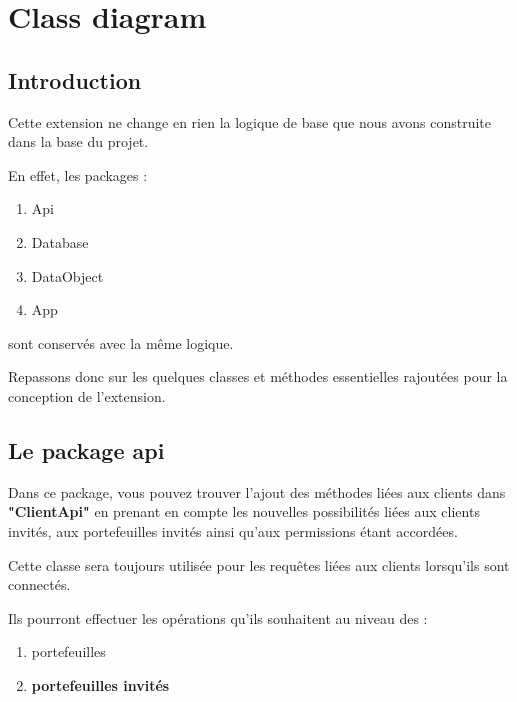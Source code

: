 \section{Class diagram}
\subsection{Introduction}
\begin{flushleft}
Cette extension ne change en rien la logique de base que nous avons construite dans la base du projet.
\end{flushleft}

\begin{flushleft}
En effet, les packages : 
\end{flushleft}
\begin{enumerate}
\item Api
\item Database
\item DataObject
\item App
\end{enumerate}
\begin{flushleft}
sont conservés avec la même logique.
\end{flushleft}

\begin{flushleft}
Repassons donc sur les quelques classes et méthodes essentielles rajoutées pour la conception de l'extension.
\end{flushleft}

\subsection{Le package api}
\begin{flushleft}
Dans ce package, vous pouvez trouver l'ajout des méthodes liées aux clients dans \textbf{"ClientApi"} en prenant en compte les nouvelles possibilités liées aux clients invités, aux portefeuilles invités ainsi qu'aux permissions étant accordées.
\end{flushleft}

\begin{flushleft}
Cette classe sera toujours utilisée pour les requêtes liées aux clients lorsqu'ils sont connectés.
\end{flushleft}

\begin{flushleft}
Ils pourront effectuer les opérations qu'ils souhaitent au niveau des :
\end{flushleft}
\begin{enumerate}
\item portefeuilles
\item \textbf{portefeuilles invités}
\end{enumerate}

